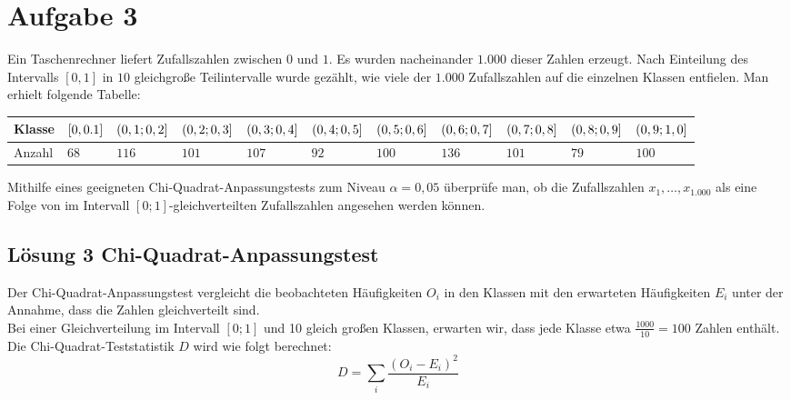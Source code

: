 \documentclass[main.tex]{subfiles}
\begin{document}
\section{Aufgabe 3}
Ein Taschenrechner liefert Zufallszahlen zwischen $0$ und $1$. Es wurden nacheinander $1.000$ dieser Zahlen erzeugt. Nach Einteilung des Intervalls $[0,1]$ in $10$ gleichgroße Teilintervalle wurde gezählt, wie viele der $1.000$ Zufallszahlen auf die einzelnen Klassen entfielen. Man erhielt folgende Tabelle:
\begin{center}
\begin{tabular}{|l|p{0.75cm}|p{0.75cm}|p{0.75cm}|p{0.75cm}|p{0.75cm}|p{0.75cm}|p{0.75cm}|p{0.75cm}|p{0.75cm}|p{0.75cm}|} \hline
Klasse & $[0,\newline0.1]$ & $(0,1; \newline 0,2]$ & $(0,2; \newline 0,3]$
	& $(0,3; \newline 0,4]$ & $(0,4; \newline 0,5]$ & $(0,5; \newline 0,6]$
	& $(0,6; \newline 0,7]$ & $(0,7; \newline 0,8]$ & $(0,8; \newline 0,9]$
	& $(0,9; \newline 1,0]$ \\ \hline
Anzahl & $68$ & $116$ & $101$ & $107$ & $92$ & $100$ & $136$ & $101$ & $79$ & $100$ \\ \hline
\end{tabular}
\end{center}
Mithilfe eines geeigneten Chi-Quadrat-Anpassungstests zum Niveau $\alpha=0,05$ überprüfe man, ob die Zufallszahlen $x_1,\dots,x_{1.000}$ als eine Folge von im Intervall $[0;1]$-gleichverteilten Zufallszahlen angesehen werden können.

\subsection{Lösung 3 Chi-Quadrat-Anpassungstest}
Der Chi-Quadrat-Anpassungstest vergleicht die beobachteten Häufigkeiten $O_i$ in den Klassen mit den erwarteten Häufigkeiten $E_i$ unter der Annahme, dass die Zahlen gleichverteilt sind.\\

Bei einer Gleichverteilung im Intervall $[0;1]$ und 10 gleich großen Klassen, erwarten wir, dass jede Klasse etwa $\frac{1000}{10} = 100$ Zahlen enthält.\\

Die Chi-Quadrat-Teststatistik $D$ wird wie folgt berechnet:
$$
   D = \sum_i \frac{(O_i - E_i)^2}{E_i}
$$
\end{document}
